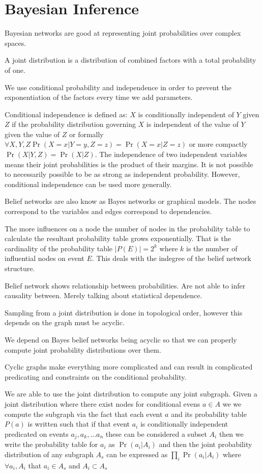 \documentclass{article}
\begin{document}
\section{Bayesian Inference}
Bayesian networks are good at representing joint probabilities over complex 
spaces. 

A joint distribution is a distribution of combined factors with a total 
probability of one. 

We use conditional probability and independence  in order to prevent the
exponentiation of the factors every time we add parameters.

Conditional independence is defined as: $X$ is conditionally independent of 
$Y$ given $Z$ if the probability distribution governing $X$ is independent of
the value of $Y$ given the value of $Z$ or formally $\forall X,Y,Z 
\Pr(X = x \vert Y = y, Z = z) = \Pr(X = x\vert Z = z)$ or more compactly
$\Pr(X \vert Y, Z) = \Pr(X \vert Z)$. The independence of two independent 
variables means their joint probabilities is the product of their margins. It
is not possible to necessarily possible to be as strong as independent 
probability. However, conditional independence can be used more generally. 

Belief networks are also know as Bayes networks or graphical models. The nodes
correspond to the variables and edges correspond to dependencies. 

The more influences on a node the number of nodes in the probability table to 
calculate the resultant probability table grows exponentially. That is the
cardinality of the probability table $\vert P(E) \vert = 2^k$ where $k$ is the
number of influential nodes on event $E$. This deals with the indegree of the
belief network structure.

Belief network shows relationship between probabilities. Are not able to infer
causality between. Merely talking about statistical dependence. 

Sampling from a joint distribution is done in topological order, however this 
depends on the graph must be acyclic.

We depend on Bayes belief networks being acyclic so that we can properly
compute joint probability distributions over them.

Cyclic graphs make everything more complicated and can result in complicated
predicating and constraints on the conditional probability. 

We are able to use the joint distribution to compute any joint subgraph. Given
a joint distribution where there exist nodes for conditional evens $a \in A$ we
we compute the subgraph via the fact that each event $a$ and its probability 
table $P(a)$ is written such that if that event $a_i$ is conditionally 
independent predicated on events $a_j, a_k, \ldots a_n$ these can be considered
a subset $A_i$ then we write the probability table for $a_i$ as $\Pr(a_i \vert
A_i)$ and then the joint probability distribution of any subgraph $A_s$ can
be expressed as $\prod_i \Pr(a_i\vert A_i)$ where $\forall a_i, A_i$ that
$a_i \in A_s$ and $A_i \subset A_s$
\end{document}
